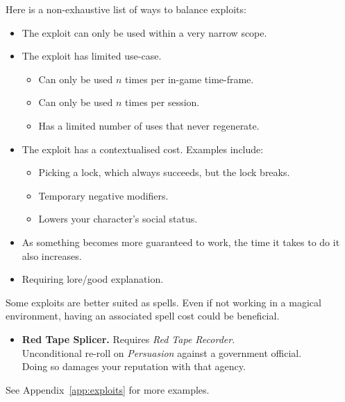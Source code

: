 Here is a non-exhaustive list of ways to balance exploits:
\begin{itemize}
    \item The exploit can only be used within a very narrow scope.
    \item The exploit has limited use-case.
    \begin{itemize}
        \item Can only be used $n$ times per in-game time-frame.
        \item Can only be used $n$ times per session.
        \item Has a limited number of uses that never regenerate.
    \end{itemize}
    \item The exploit has a contextualised cost. Examples include:
    \begin{itemize}
        \item Picking a lock, which always succeeds, but the lock breaks.
        \item Temporary negative modifiers.
        \item Lowers your character's social status.
    \end{itemize}
    \item As something becomes more guaranteed to work, the time it takes to do it also increases.
    \item Requiring lore/good explanation.
\end{itemize}

Some exploits are better suited as spells. 
Even if not working in a magical environment, having an associated spell cost could be beneficial.

\example
\begin{itemize}
    \item \textbf{Red Tape Splicer.} Requires \textit{Red Tape Recorder}.\\
    Unconditional re-roll on \textit{Persuasion} against a government official.\\
    Doing so damages your reputation with that agency.
\end{itemize}
See Appendix~\ref{app:exploits} for more examples.